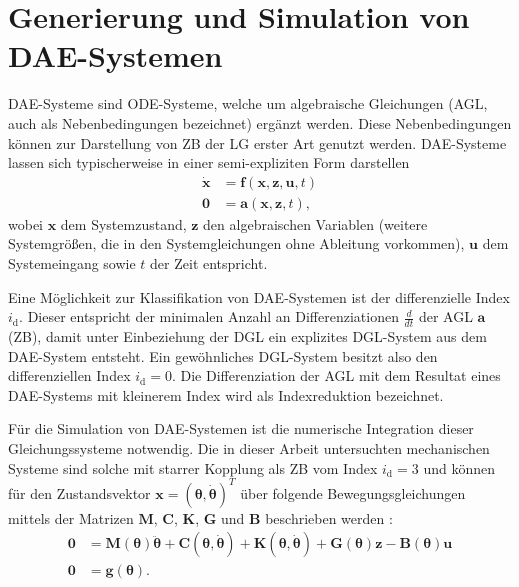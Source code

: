 \section{Generierung und Simulation von DAE-Systemen}
DAE-Systeme sind ODE-Systeme, welche um algebraische Gleichungen (AGL, auch als Nebenbedingungen bezeichnet) ergänzt werden. Diese Nebenbedingungen können zur Darstellung von ZB der LG erster Art genutzt werden. DAE-Systeme lassen sich typischerweise in einer semi-expliziten Form darstellen
	\begin{subequations}
	\label{eq:dae_std}
	\begin{align}
		\mathbf{\dot{x}} &= \mathbf{f}(\mathbf{x}, \mathbf{z}, \mathbf{u}, t) \\
		\mathbf{0} &= \mathbf{a}(\mathbf{x}, \mathbf{z}, t),
	\end{align}
	\end{subequations}
wobei $\mathbf{x}$ dem Systemzustand, $\mathbf{z}$ den algebraischen Variablen (weitere Systemgrößen, die in den Systemgleichungen ohne Ableitung vorkommen), $\mathbf{u}$ dem Systemeingang sowie $t$ der Zeit entspricht. \cite[S.137]{JanschekSystementwurf}

Eine Möglichkeit zur Klassifikation von DAE-Systemen ist der differenzielle Index $i_\mathrm{d}$. Dieser entspricht der minimalen Anzahl an Differenziationen $\frac{d}{dt}$ der AGL $\mathbf{a}$ (ZB), damit unter Einbeziehung der DGL ein explizites DGL-System aus dem DAE-System entsteht. Ein gewöhnliches DGL-System besitzt also den differenziellen Index $i_\mathrm{d} = 0$. Die Differenziation der AGL mit dem Resultat eines DAE-Systems mit kleinerem Index wird als Indexreduktion bezeichnet. \cite[S.139]{JanschekSystementwurf}

Für die Simulation von DAE-Systemen ist die numerische Integration dieser Gleichungssysteme notwendig. Die in dieser Arbeit untersuchten mechanischen Systeme sind solche mit starrer Kopplung als ZB vom Index $i_\mathrm{d} = 3$ und können für den Zustandsvektor $\mathbf{x} = (\boldsymbol{\theta}, \dot{\boldsymbol{\theta}})^T$ über folgende Bewegungsgleichungen mittels der Matrizen $\mathbf{M}$, $\mathbf{C}$, $\mathbf{K}$, $\mathbf{G}$ und $\mathbf{B}$ beschrieben werden \cite[S.240]{JanschekSystementwurf}:
\begin{subequations}
\label{eq:implicit_mechanical_system}
\begin{align}
	\mathbf{0} &= \mathbf{M}(\boldsymbol{\theta}) \ddot{\boldsymbol{\theta}} + \mathbf{C}(\boldsymbol{\theta}, \dot{\boldsymbol{\theta}}) + \mathbf{K}(\boldsymbol{\theta}, \dot{\boldsymbol{\theta}}) + \mathbf{G}(\boldsymbol{\theta}) \mathbf{z} - \mathbf{B}(\boldsymbol{\theta}) \mathbf{u}\\
	\mathbf{0} &= \mathbf{g}(\boldsymbol{\theta}).
\end{align}
\end{subequations}

